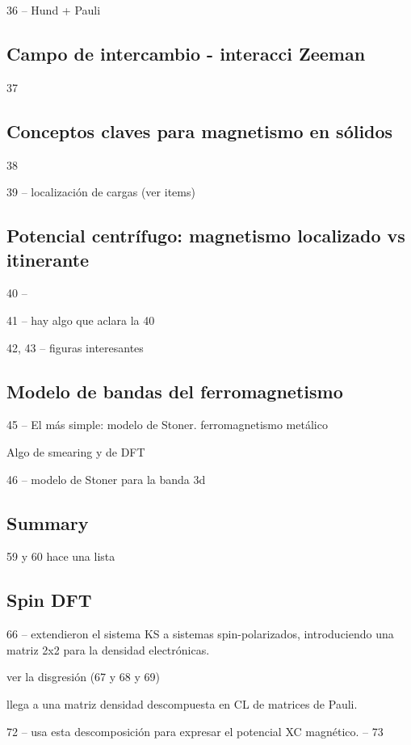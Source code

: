   36 -- Hund + Pauli

\subsection{Campo de intercambio - interacci Zeeman}

  37

\subsection{Conceptos claves para magnetismo en sólidos}

  38

  39 -- localización de cargas (ver items)

\subsection{Potencial centrífugo: magnetismo localizado vs itinerante}

  40 --

  41 -- hay algo que aclara la 40

  42, 43 -- figuras interesantes

\subsection{Modelo de bandas del ferromagnetismo}

  45 -- El más simple: modelo de Stoner. ferromagnetismo metálico

  Algo de smearing y de DFT

  46 -- modelo de Stoner para la banda 3d

\subsection{Summary}

  59 y 60 hace una lista

\subsection{Spin DFT}

  66 -- extendieron el sistema KS a sistemas spin-polarizados, introduciendo una matriz 2x2 para la densidad electrónicas.

  ver la disgresión (67 y 68 y 69)

  llega a una matriz densidad descompuesta en CL de matrices de Pauli.

  72 -- usa esta descomposición para expresar el potencial XC magnético. -- 73


